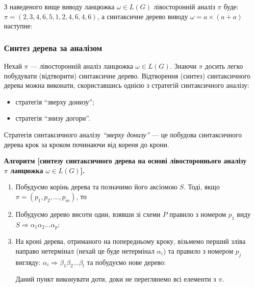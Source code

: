 З наведеного вище виводу ланцюжка $\omega \in L(G)$ лівосторонній аналіз $\pi$ буде: $\pi = (2, 3, 4, 6, 5, 1, 2, 4, 6, 4, 6)$, а синтаксичне дерево виводу $\omega = a \times (a + a)$ наступне:
\begin{figure}[H]
	\centering
	
\end{figure}

\subsubsection{Синтез дерева за аналізом}

Нехай $\pi$ --- лівосторонній аналіз ланцюжка $\omega \in L(G)$. Знаючи $\pi$ досить легко побудувати (відтворити) синтаксичне дерево. Відтворення (синтез) синтаксичного дерева можна виконати, скориставшись однією з стратегій синтаксичного аналізу:
\begin{itemize}
	\item стратегія ``зверху донизу'';
	\item стратегія ``знизу догори''.
\end{itemize}

Стратегія синтаксичного аналізу \textit{``зверху донизу''} --- це побудова синтаксичного дерева крок за кроком починаючи від кореня до крони. \medskip

\textbf{Алгоритм [синтезу синтаксичного дерева на основі лівостороннього аналізу $\pi$ ланцюжка $\omega \in L(G)$].}
\begin{enumerate}
	\item Побудуємо корінь дерева та позначимо його аксіомою $S$. Тоді, якщо $\pi = (p_1, p_2, \ldots, p_m)$, то

	\item Побудуємо дерево висоти один, взявши зі схеми $P$ правило з номером $p_1$ виду $S \Rightarrow \alpha_1 \alpha_2 \ldots \alpha_p$:
	\begin{figure}[H]
		\centering
		
	\end{figure}

	\item На кроні дерева, отриманого на попередньому кроку, візьмемо перший зліва направо нетермінал (нехай це буде нетермінал $\alpha_i$) та правило з номером $p_j$ вигляду: $\alpha_i \Rightarrow \beta_1 \beta_2 \ldots \beta_l$ та побудуємо нове дерево:
	\begin{figure}[H]
		\centering
		
	\end{figure}

	Даний пункт виконувати доти, доки не переглянемо всі елементи з $\pi$.
\end{enumerate}

